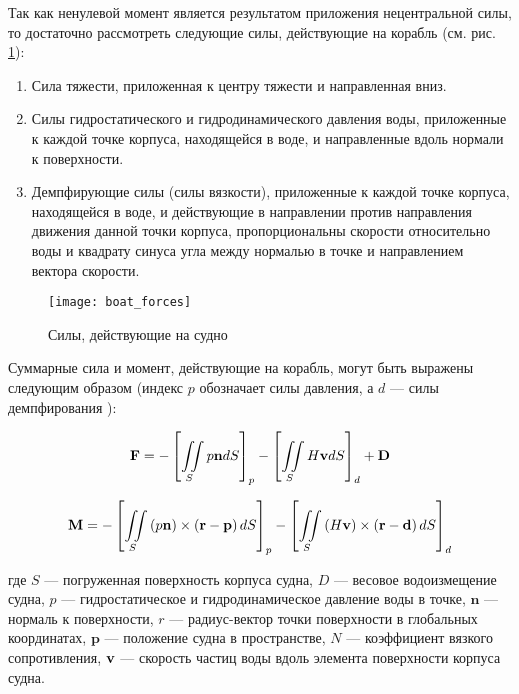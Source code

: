 Так как ненулевой момент является результатом приложения нецентральной силы, то достаточно рассмотреть следующие силы, действующие на корабль (см. рис. \ref{boat_forces}):
\begin{enumerate}
	\item	Сила тяжести, приложенная к центру тяжести и 
			направленная вниз.
	\item	Силы гидростатического и гидродинамического давления воды, приложенные к каждой точке корпуса, 
			находящейся в воде, и направленные вдоль нормали к поверхности.
	\item	Демпфирующие силы (силы вязкости), приложенные к каждой точке корпуса, 
			находящейся в воде, и действующие в направлении против 
			направления движения  данной точки корпуса, пропорциональны скорости 
			относительно воды и квадрату синуса угла между нормалью в точке и направлением 
			вектора скорости.
\end{enumerate}

\begin{figure}[ht]
\begin{center}
\texttt{[image: boat\_forces]}
\end{center}
\caption{Силы, действующие на судно}
\label{boat_forces}
\end{figure}

Суммарные сила и момент, действующие на корабль, могут быть выражены следующим образом (индекс $p$ обозначает силы давления, а $d$ --- силы демпфирования ):

\begin{equation}
	\mathbf{F} = 
		-\left[ \iint\limits_{S} p \mathbf{n} dS 	\right]_{p}
		-\left[ \iint\limits_{S} H \mathbf{v} dS 	\right]_{d}
		+ \mathbf{D}
	\label{F=integral}
\end{equation}

\begin{equation}
	\mathbf{M} = 
	-\left[ 
		\iint\limits_{S} 
		\left( p \mathbf{n} \right) \times 
		\left( \mathbf{r} - \mathbf{p} \right) dS	
	\right]_{p}
	-\left[ \iint\limits_{S} 
		\left( H \mathbf{v} \right) \times 
		\left( \mathbf{r} - \mathbf{d} \right) dS	
	\right]_{d}
	\label{M=integral}
\end{equation}

где $S$ --- погруженная поверхность корпуса судна, $D$ --- весовое водоизмещение судна, $p$ --- гидростатическое и гидродинамическое давление воды в точке, $\mathbf{n}$ --- нормаль к поверхности, $r$ --- радиус-вектор точки поверхности в глобальных координатах, $\mathbf{p}$ --- положение судна в пространстве, $N$ --- коэффициент вязкого сопротивления, $\mathbf{v}$ --- скорость частиц воды вдоль элемента поверхности корпуса судна.

